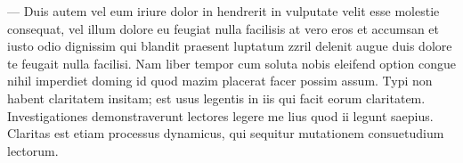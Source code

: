 
 --- Duis autem vel eum iriure dolor in
hendrerit in vulputate velit esse molestie consequat, vel
illum dolore eu feugiat nulla facilisis at vero eros et
accumsan et iusto odio dignissim qui blandit praesent
luptatum zzril delenit augue duis dolore te feugait nulla
facilisi. Nam liber tempor cum soluta nobis eleifend option
congue nihil imperdiet doming id quod mazim placerat facer
possim assum. Typi non habent claritatem insitam; est usus
legentis in iis qui facit eorum claritatem. Investigationes
demonstraverunt lectores legere me lius quod ii legunt
saepius. Claritas est etiam processus dynamicus, qui sequitur
mutationem consuetudium lectorum.

